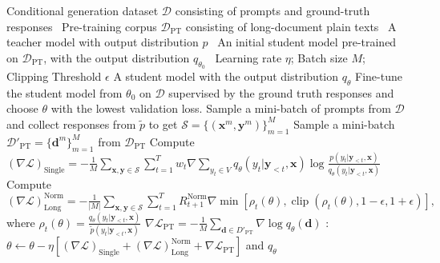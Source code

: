 \documentclass{article}
\def\pst{q_{\theta}(y_t | \by_{<t}, \bx)}
\def\ptt{p(y_t | \by_{<t}, \bx)}
\def\pmt{\widetilde{p}(y_t | \by_{<t}, \bx)}
\def\bx{\bm{x}}
\def\by{\bm{y}}
\begin{document}
\begin{algorithm}
    \small
    \label{alg:minillm}
    \caption{\textsc{MiniLLM}: Knowledge Distillation of LLMs}
    \begin{algorithmic}
        \Require Conditional generation dataset $\mathcal{D}$ consisting of prompts and ground-truth responses
        \State \quad \quad \ Pre-training corpus $\mathcal{D}_{\text{PT}}$ consisting of long-document plain texts
        \State \quad \quad \ A teacher model with output distribution $p$
        \State \quad \quad \ An initial student model pre-trained on $\mathcal{D}_{\text{PT}}$, with the output distribution $q_{\theta_0}$
        \State \quad \quad \ Learning rate $\eta$; \quad Batch size $M$; \quad Clipping Threshold $\epsilon$
        \Ensure A student model with the output distribution $q_\theta$
        \State Fine-tune the student model from $\theta_0$ on $\mathcal{D}$ supervised by the ground truth responses and choose $\theta$ with the lowest validation loss.
        \Repeat
        \State Sample a mini-batch of prompts from $\mathcal{D}$ and collect responses from $\widetilde{p}$ to get $\mathcal{S}=\{(\bx^m, \by^m)\}_{m=1}^M$ 
        \State Sample a mini-batch $\mathcal{D'}_{\text{PT}} = \{\bm{d}^m\}_{m=1}^M$ from $\mathcal{D}_{\text{PT}}$
        \State Compute 
        $%
            (\nabla \mathcal{L})_{\text{Single}} = -\frac{1}{M}\sum_{\bx, \by\in \mathcal{S}} \sum_{t=1}^T w_t \nabla \sum_{y_t \in V} \pst \log \frac{\ptt}{\pst} 
        $%
        \State Compute 
        $%
            (\nabla \mathcal{L})_{\text{Long}}^{\text{Norm}}=-\frac{1}{|M|}\sum_{\bx, \by\in \mathcal{S}} \sum_{t=1}^T R^{\text{Norm}}_{t+1}\nabla \min [\rho_t(\theta), \operatorname{clip}(\rho_t(\theta), 1-\epsilon, 1+\epsilon)],
        $%
        \State where $\rho_t(\theta) = \frac{\pst}{\pmt}$ 
        $%
            \nabla \mathcal{L}_\text{PT} = -\frac{1}{M} \sum_{\bm{d} \in D'_\text{PT}} \nabla \log q_{\theta}(\bm{d})
        $%
        : $\theta \leftarrow \theta - \eta\left[(\nabla \mathcal{L})_{\text{Single}} + (\nabla \mathcal{L})_{\text{Long}}^{\text{Norm}} + \nabla \mathcal{L}_\text{PT}\right]$
         and \Return $q_\theta$
    \end{algorithmic}
\end{algorithm}
\end{document}
